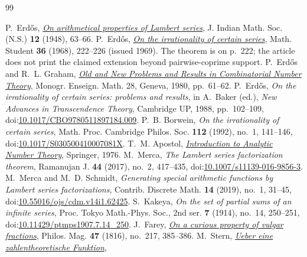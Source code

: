 \documentclass[11pt]{article}
\theoremstyle{definition}
\theoremstyle{remark}
\begin{document}
\begin{thebibliography}{99}
\small
\raggedright
\setlength{\itemsep}{0pt}
 P.~Erd\H{o}s,
  \href{https://users.renyi.hu/~p_erdos/1948-04.pdf}{\emph{On arithmetical properties of Lambert series}},
  J. Indian Math. Soc. (N.S.) \textbf{12} (1948), 63--66.
 P.~Erd\H{o}s,
  \href{https://users.renyi.hu/~p_erdos/1969-09.pdf}{\emph{On the irrationality of certain series}},
  Math. Student \textbf{36} (1968), 222--226 (issued 1969).  The theorem is
  on p.~222; the article does not print the claimed extension beyond
  pairwise-coprime support.
 P.~Erd\H{o}s and R.~L. Graham,
  \href{https://mathweb.ucsd.edu/~ronspubs/80_11_number_theory.pdf}{\emph{Old and New Problems and Results in Combinatorial Number Theory}},
  Monogr. Enseign. Math. 28, Geneva, 1980, pp.~61--62.
 P.~Erd\H{o}s, \emph{On the irrationality of certain series: problems and
  results}, in A.~Baker (ed.), \emph{New Advances in Transcendence Theory},
  Cambridge UP, 1988, pp.~102--109,
  doi:\href{https://doi.org/10.1017/CBO9780511897184.009}{10.1017/CBO9780511897184.009}.
 P.~B. Borwein, \emph{On the irrationality of certain series},
  Math. Proc. Cambridge Philos. Soc. \textbf{112} (1992), no.~1, 141--146,
  doi:\href{https://doi.org/10.1017/S030500410007081X}{10.1017/S030500410007081X}.
 T.~M. Apostol,
  \href{https://doi.org/10.1007/978-1-4757-5579-4}{\emph{Introduction to Analytic Number Theory}},
  Springer, 1976.
 M.~Merca, \emph{The Lambert series factorization theorem},
  Ramanujan J. \textbf{44} (2017), no.~2, 417--435,
  doi:\href{https://doi.org/10.1007/s11139-016-9856-3}{10.1007/s11139-016-9856-3}.
 M.~Merca and M.~D. Schmidt, \emph{Generating special arithmetic
  functions by Lambert series factorizations}, Contrib. Discrete Math. \textbf{14}
  (2019), no.~1, 31--45,
  doi:\href{https://doi.org/10.55016/ojs/cdm.v14i1.62425}{10.55016/ojs/cdm.v14i1.62425}.
 S.~Kakeya, \emph{On the set of partial sums of an infinite series},
  Proc. Tokyo Math.-Phys. Soc., 2nd ser. \textbf{7} (1914), no.~14, 250--251,
  doi:\href{https://doi.org/10.11429/ptmps1907.7.14_250}{10.11429/ptmps1907.7.14\_250}.
 J.~Farey,
  \href{https://doi.org/10.1080/14786441608628487}{\emph{On a curious property of vulgar fractions}},
  Philos. Mag. \textbf{47} (1816), no.~217, 385--386.
 M.~Stern,
  \href{https://doi.org/10.1515/crll.1858.55.193}{\emph{Ueber eine zahlentheoretische Funktion}},

\end{thebibliography}
\end{document}
